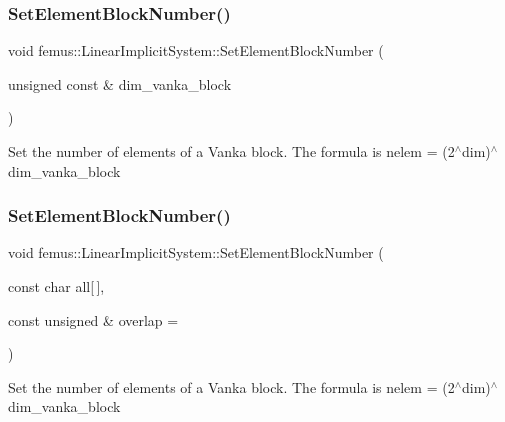\subsubsection{\texorpdfstring{Set\+Element\+Block\+Number()}{SetElementBlockNumber()}\hspace{0.1cm}{\footnotesize\ttfamily [1/2]}}
{\footnotesize\ttfamily void femus\+::\+Linear\+Implicit\+System\+::\+Set\+Element\+Block\+Number (\begin{DoxyParamCaption}\item[{unsigned const \&}]{dim\+\_\+vanka\+\_\+block }\end{DoxyParamCaption})}

Set the number of elements of a Vanka block. The formula is nelem = (2$^\wedge$dim)$^\wedge$dim\+\_\+vanka\+\_\+block \mbox{\label{classfemus_1_1_linear_implicit_system_a3aaf2c29547bec8989c0d1a1c473126f}} 
\subsubsection{\texorpdfstring{Set\+Element\+Block\+Number()}{SetElementBlockNumber()}\hspace{0.1cm}{\footnotesize\ttfamily [2/2]}}
{\footnotesize\ttfamily void femus\+::\+Linear\+Implicit\+System\+::\+Set\+Element\+Block\+Number (\begin{DoxyParamCaption}\item[{const char}]{all\mbox{[}$\,$\mbox{]},  }\item[{const unsigned \&}]{overlap = {} }\end{DoxyParamCaption})}

Set the number of elements of a Vanka block. The formula is nelem = (2$^\wedge$dim)$^\wedge$dim\+\_\+vanka\+\_\+block \mbox{\label{classfemus_1_1_linear_implicit_system_a77a2067dedf848a63091d5c10b49daff}} 

